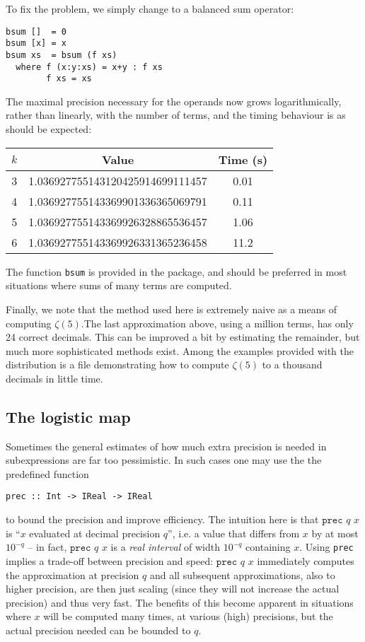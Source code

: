 \documentclass[9pt, a4, twocolumn]{article}
\begin{document}
To fix the problem, we simply change to a balanced sum operator:
\begin{verbatim}
bsum []  = 0
bsum [x] = x
bsum xs  = bsum (f xs)
  where f (x:y:xs) = x+y : f xs
        f xs = xs
\end{verbatim}
The maximal precision necessary for the operands now grows
logarithmically, rather than linearly, with the number of terms, and the timing behaviour is as should be expected:
   \begin{center}
     \begin{tabular}{|c|c|c|} \hline
       $k$ & Value & Time (s)\\ \hline
       3 & 1.036927755143120425914699111457 & 0.01 \\
       4 & 1.036927755143369901336365069791 & 0.11 \\
       5 & 1.036927755143369926328865536457 & 1.06  \\
       6 & 1.036927755143369926331365236458 & 11.2 \\ \hline
     \end{tabular}
   \end{center}
The function \texttt{bsum} is provided in the package, and should be
preferred in most situations where sums of many terms are computed.

Finally, we note that the method used here is extremely naive as a means of
computing $\zeta(5)$.The last approximation above, using a million
terms, has only 24 correct decimals. This can be improved a bit by
estimating the remainder, but much more sophisticated methods
exist. Among the examples provided with the distribution is a file
demonstrating how to compute $\zeta(5)$ to a
thousand decimals in little time.

\subsection{The logistic map}

Sometimes the general estimates of how much extra precision is 
needed in subexpressions are far too pessimistic. In such cases one
may use the  the predefined function 
\begin{verbatim}
prec :: Int -> IReal -> IReal
\end{verbatim}
to bound the precision and improve efficiency.
The intuition here is that $\texttt{prec } q \,\, x$ is ``$x$
evaluated at decimal precision $q$'', i.e. a value that differs from $x$ by at
most $10^{-q}$ -- in fact,  $\texttt{prec } q \,\, x$ is a \emph{real
  interval} of width $10^{-q}$ containing $x$. Using \texttt{prec}
implies a trade-off between precision and speed: $\texttt{prec } q \,\, x$
immediately computes the approximation at precision $q$ and all subsequent
approximations, also to higher precision, are then just scaling (since they will not increase the
actual precision) and thus very fast.  
The benefits of this become apparent in situations where  $x$ will be computed
many times, at various (high) precisions, but the actual precision needed
can be bounded to $q$.
\end{document}
